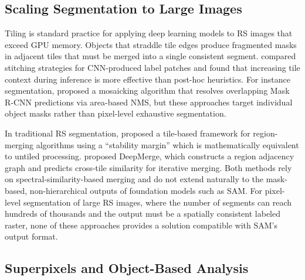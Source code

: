 \documentclass[review,11pt,authoryear]{elsarticle}
\begin{document}
\subsection{Scaling Segmentation to Large Images}
\label{sec:related_tiling}

Tiling is standard practice for applying deep learning models to RS images that exceed GPU memory. Objects that straddle tile edges produce fragmented masks in adjacent tiles that must be merged into a single consistent segment. \citet{huang2018tiling} compared stitching strategies for CNN-produced label patches and found that increasing tile context during inference is more effective than post-hoc heuristics. For instance segmentation, \citet{carvalho2021instance} proposed a mosaicking algorithm that resolves overlapping Mask R-CNN predictions via area-based NMS, but these approaches target individual object masks rather than pixel-level exhaustive segmentation.

In traditional RS segmentation, \citet{lassalle2015scalable} proposed a tile-based framework for region-merging algorithms using a ``stability margin'' which is mathematically equivalent to untiled processing. \citet{lv2025deepmerge} proposed DeepMerge, which constructs a region adjacency graph and predicts cross-tile similarity for iterative merging. Both methods rely on spectral-similarity-based merging and do not extend naturally to the mask-based, non-hierarchical outputs of foundation models such as SAM. For pixel-level segmentation of large RS images, where the number of segments can reach hundreds of thousands and the output must be a spatially consistent labeled raster, none of these approaches provides a solution compatible with SAM's output format.

\subsection{Superpixels and Object-Based Analysis}
\label{sec:related_superpixels}
\end{document}
